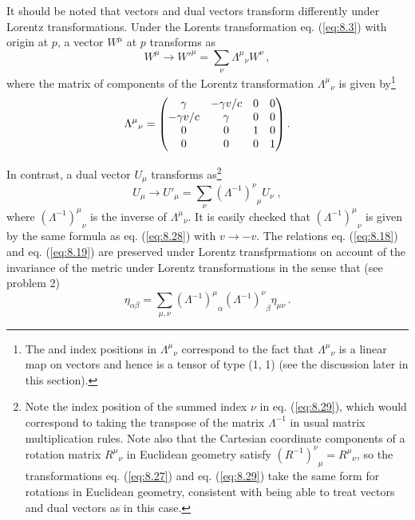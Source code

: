 It should be noted that vectors and dual vectors transform differently under Lorentz transformations. Under the Lorents transformation eq. (\ref{eq:8.3}) with origin at $p$, a vector $W^\mu$ at $p$ transforms as 
\begin{equation}\label{eq:8.27}
W^\mu \rightarrow W'^\mu = \sum_\nu {\Lambda^\mu}_\nu W^\nu\,,
\end{equation}
where the matrix of components of the Lorentz transformation ${\Lambda^\mu}_\nu$ is given by\footnote{The  and  index positions in ${\Lambda^\mu}_\nu$ correspond to the fact that ${\Lambda^\mu}_\nu$ is a linear map on vectors and hence is a tensor of type (1, 1) (see the discussion later in this section).}
\begin{equation}\label{eq:8.28}
{\Lambda^\mu}_\nu = \mqty(\gamma &-\gamma v/c &0 &0\\
                         -\gamma v/c &\gamma &0 &0\\
                          0 &0 &1 &0\\
                          0 &0 &0 &1) \,.
\end{equation}
 
In contrast, a dual vector $U_\mu$ transforms as\footnote{Note the index position of the summed index $\nu$ in eq. (\ref{eq:8.29}), which would correspond to taking the transpose of the matrix $\Lambda^{-1}$ in usual matrix multiplication rules. Note also that the Cartesian coordinate components of a rotation matrix ${R^\mu}_\nu$ in Euclidean geometry satisfy ${(R^{-1})^\nu}_\mu = {R^\mu}_\nu$, so the transformations eq. (\ref{eq:8.27}) and eq. (\ref{eq:8.29}) take the same form for rotations in Euclidean geometry, consistent with being able to treat vectors and dual vectors as  in this case.}
\begin{equation}\label{eq:8.29}
U_\mu \rightarrow U'_\mu = \sum_\nu {(\Lambda^{-1})^\nu}_\mu U_\nu\;,
\end{equation}
where ${(\Lambda^{-1})^\mu}_\nu$  is the inverse of ${\Lambda^\mu}_{\nu}$. It is easily checked that 
${(\Lambda^{-1})^\mu}_\nu$ is given by the same formula as eq. (\ref{eq:8.28}) with $v \rightarrow -v$. 
The relations eq. (\ref{eq:8.18}) and eq. (\ref{eq:8.19}) are preserved under Lorentz transfprmations on account of the invariance of the metric under Lorentz transformations in the sense that (see problem 2)
\begin{equation}\label{eq:8.30}
\eta_{\alpha \beta} = \sum_{\mu,\nu}{(\Lambda^{-1})^\mu}_\alpha {(\Lambda^{-1})^\nu}_\beta \eta_{\mu \nu}  \,.
\end{equation}
  
